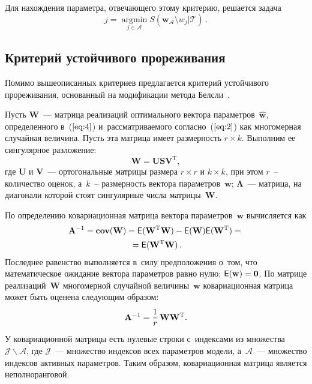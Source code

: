\begin{multicols}{2}
Для нахождения параметра, отвечающего этому критерию, решается задача
\begin{equation}
\label{eq:7}
\hat{j} = \mathop{\arg\min}\limits_{{j \in \mathcal{A}}}S(\mathbf{w}_{\mathcal{A}}
\setminus {w_j}|\mathcal{T})\,.
\end{equation}

\subsection{Критерий устойчивого прореживания}

Помимо вышеописанных критериев предлагается критерий устойчивого прореживания,
основанный на модификации метода Белсли~\cite{Belsley2005, Sandulyanu2012Feature}.

Пусть $\mathbf{W}$~--- матрица реализаций оптимального вектора
параметров~$\mathbf{\hat{w}}$, определенного в~($\ref{eq:4}$)
и~рассматриваемого согласно~($\ref{eq:2}$) как
многомерная случайная величина. Пусть эта матрица имеет размерность $r \times k$.
Выполним ее сингулярное разложение:
\begin{equation}
\label{eq:8}
\mathbf{W} = \mathbf{U}\mathbf{S}\mathbf{V}^{\mathrm{T}},
\end{equation}
где $\mathbf{U}$ и $\mathbf{V}$~--- ортогональные матрицы размера
$r \times r$ и $k \times k$, при этом $r$~-- количество оценок,
а~$k$~-- размерность вектора параметров~$\mathbf{w}$; $\mathbf{\Lambda}$~---
матрица, на диагонали которой стоят сингулярные числа матрицы~$\mathbf{W}$.

По определению ковариационная матрица вектора параметров~$\mathbf{w}$
вычисляется как
\begin{multline*}
\mathbf{A}^{-1} = \text{\bf{cov}}(\mathbf{W}) =
 \mathsf{E}(\mathbf{W}^{\mathrm{T}}\mathbf{W}) -
\mathsf{E}(\mathbf{W})\mathsf{E}(\mathbf{W}^{\mathrm{T}}) ={}\\
{}= \mathsf{E}(\mathbf{W}^{\mathrm{T}}\mathbf{W})\,.
\end{multline*}
Последнее равенство выполняется в~силу предположения о~том,
что математическое ожидание вектора параметров равно нулю:
$\mathsf{E}(\mathbf{w}) \hm= \boldsymbol{0}$. По матрице реализаций~$\mathbf{W}$
многомерной случайной величины~$\mathbf{w}$ ковариационная матрица может быть
оценена следующим образом:
\begin{equation*}
\mathbf{A}^{-1} = \displaystyle\frac{\displaystyle 1\mathstrut}{\displaystyle r\mathstrut}\,\mathbf{W}\mathbf{W}^{\mathrm{T}}.
\end{equation*}
У ковариационной матрицы есть нулевые строки с~индексами из
множества $\mathcal{J}\backslash\mathcal{A}$, где $\mathcal{J}$~---
множество индексов всех параметров модели,
а~$\mathcal{A}$~--- множество индексов активных параметров. Таким образом,
ковариационная матрица является неполноранговой.


\end{multicols}
